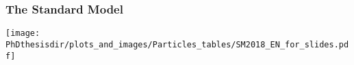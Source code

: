 \begin{frame}
\frametitle{The Standard Model}
\begin{center}
\texttt{[image: \\PhDthesisdir/plots\_and\_images/Particles\_tables/SM2018\_EN\_for\_slides.pdf]}
\end{center}
\end{frame}
